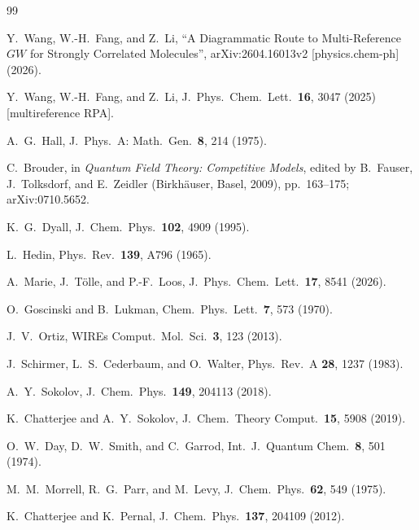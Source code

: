 \documentclass[11pt,a4paper]{article}
\begin{document}
\begin{thebibliography}{99}

Y.~Wang, W.-H.~Fang, and Z.~Li,
``A Diagrammatic Route to Multi-Reference $GW$ for Strongly Correlated Molecules'',
arXiv:2604.16013v2 [physics.chem-ph] (2026).

Y.~Wang, W.-H.~Fang, and Z.~Li,
J.~Phys.~Chem.~Lett.\ \textbf{16}, 3047 (2025) [multireference RPA].

A.~G.~Hall, J.~Phys.~A: Math.~Gen.\ \textbf{8}, 214 (1975).

C.~Brouder, in \emph{Quantum Field Theory: Competitive Models},
edited by B.~Fauser, J.~Tolksdorf, and E.~Zeidler (Birkh\"auser, Basel, 2009),
pp.~163--175; arXiv:0710.5652.

K.~G.~Dyall, J.~Chem.~Phys.\ \textbf{102}, 4909 (1995).

L.~Hedin, Phys.~Rev.\ \textbf{139}, A796 (1965).

A.~Marie, J.~T\"olle, and P.-F.~Loos,
J.~Phys.~Chem.~Lett.\ \textbf{17}, 8541 (2026).

O.~Goscinski and B.~Lukman, Chem.~Phys.~Lett.\ \textbf{7}, 573 (1970).

J.~V.~Ortiz, WIREs Comput.~Mol.~Sci.\ \textbf{3}, 123 (2013).

J.~Schirmer, L.~S.~Cederbaum, and O.~Walter, Phys.~Rev.~A \textbf{28}, 1237 (1983).

A.~Y.~Sokolov, J.~Chem.~Phys.\ \textbf{149}, 204113 (2018).

K.~Chatterjee and A.~Y.~Sokolov, J.~Chem.~Theory Comput.\ \textbf{15}, 5908 (2019).

O.~W.~Day, D.~W.~Smith, and C.~Garrod, Int.~J.~Quantum Chem.\ \textbf{8}, 501 (1974).

M.~M.~Morrell, R.~G.~Parr, and M.~Levy, J.~Chem.~Phys.\ \textbf{62}, 549 (1975).

K.~Chatterjee and K.~Pernal, J.~Chem.~Phys.\ \textbf{137}, 204109 (2012).

\end{thebibliography}
\end{document}
